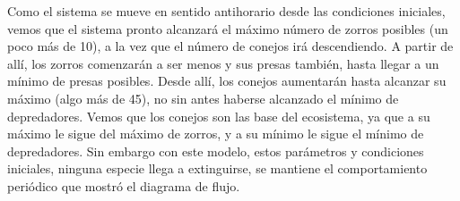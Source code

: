 \documentclass[12pt,letterpaper]{article}
\begin{document}
Como el sistema se mueve en sentido antihorario desde las condiciones iniciales, vemos que el sistema pronto alcanzará el máximo número de zorros posibles (un poco más de 10), a la vez que el número de conejos irá descendiendo. A partir de allí, los zorros comenzarán a ser menos y  sus presas también, hasta llegar a un 
mínimo de presas posibles. Desde allí, los conejos aumentarán hasta alcanzar su máximo (algo más de 45), no sin antes haberse alcanzado el mínimo de depredadores. Vemos que los conejos son las base del ecosistema, ya que a su máximo le sigue del máximo de zorros, y a su mínimo le sigue el mínimo de depredadores. Sin embargo con este modelo, estos parámetros y condiciones iniciales, ninguna especie llega a extinguirse, se mantiene el comportamiento periódico que mostró el diagrama de flujo.
\end{document}
